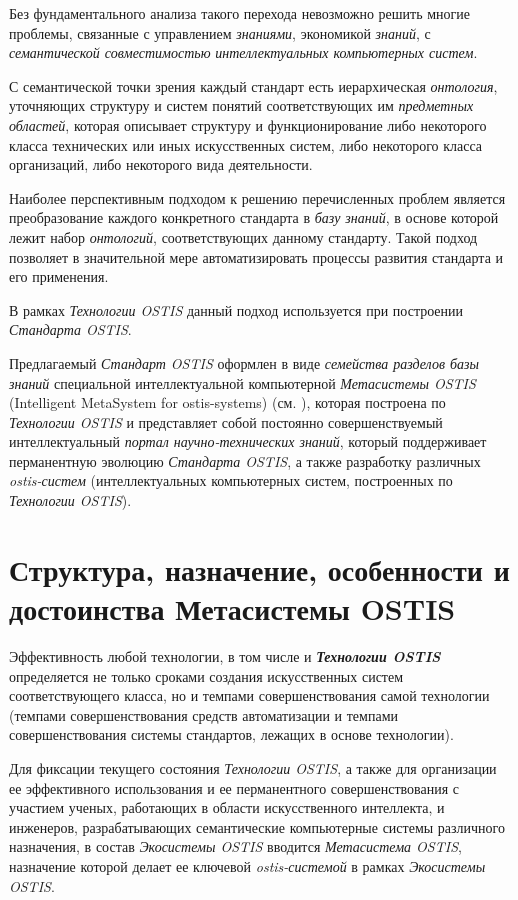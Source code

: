 Без фундаментального анализа такого перехода невозможно решить многие проблемы, связанные с управлением \textit{знаниями}, экономикой \textit{знаний}, с \textit{семантической совместимостью} \textit{интеллектуальных компьютерных систем}.

С семантической точки зрения каждый стандарт есть иерархическая \textit{онтология}, уточняющих структуру и систем понятий соответствующих им \textit{предметных областей}, которая описывает структуру и функционирование либо некоторого класса технических или иных искусственных систем, либо некоторого класса организаций, либо некоторого вида деятельности. 

Наиболее перспективным подходом к решению перечисленных проблем является преобразование каждого конкретного стандарта в \textit{базу знаний}, в основе которой лежит набор \textit{онтологий}, соответствующих данному стандарту. Такой подход позволяет в значительной мере автоматизировать процессы развития стандарта и его применения.

В рамках \textit{Технологии OSTIS} данный подход используется при построении \textit{Стандарта OSTIS}.
 
Предлагаемый \textit{Стандарт OSTIS} оформлен в виде \textit{семейства разделов базы знаний} специальной интеллектуальной компьютерной \textit{Метасистемы OSTIS} (Intelligent MetaSystem for ostis-systems) (см. ), которая построена по \textit{Технологии OSTIS} и представляет собой постоянно совершенствуемый интеллектуальный \textit{портал научно-технических знаний}, который поддерживает перманентную эволюцию \textit{Стандарта OSTIS}, а также разработку различных \textit{ostis-систем} (интеллектуальных компьютерных систем, построенных по \textit{Технологии OSTIS}).


\section{Структура, назначение, особенности и достоинства Метасистемы OSTIS}
\label{sec_metasystem}

Эффективность любой технологии, в том числе и \textbf{\textit{Технологии OSTIS}} определяется не только сроками создания искусственных систем соответствующего класса, но и темпами совершенствования самой технологии (темпами совершенствования средств автоматизации и темпами совершенствования системы стандартов, лежащих в основе технологии).

Для фиксации текущего состояния \textit{Технологии OSTIS}, а также для организации ее эффективного использования и ее перманентного совершенствования с участием ученых, работающих в области искусственного интеллекта, и инженеров, разрабатывающих семантические компьютерные системы различного назначения, в состав \textit{Экосистемы OSTIS} вводится \textit{Метасистема OSTIS}, назначение которой делает ее ключевой \textit{ostis-системой} в рамках \textit{Экосистемы OSTIS}.

